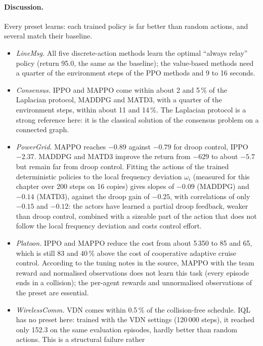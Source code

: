 \paragraph{Discussion.} Every preset learns: each trained policy is far better
than random actions, and several match their baseline.

\begin{itemize}
  \item \emph{LineMsg.} All five discrete-action methods learn the optimal
    ``always relay'' policy (return 95.0, the same as the baseline); the
    value-based methods need a quarter of the environment steps of the PPO
    methods and 9 to 16 seconds.
  \item \emph{Consensus.} IPPO and MAPPO come within about 2 and 5\,\% of the
    Laplacian protocol, MADDPG and MATD3, with a quarter of the environment
    steps, within about 11 and 14\,\%. The Laplacian protocol is a strong reference
    here: it is the classical solution of the consensus problem on a
    connected graph.
  \item \emph{PowerGrid.} MAPPO reaches $-0.89$ against $-0.79$ for droop
    control, IPPO $-2.37$. MADDPG and MATD3 improve the return from $-629$ to
    about $-5.7$ but remain far from droop control. Fitting the actions of the
    trained deterministic policies to the local frequency deviation $\omega_i$
    (measured for this chapter over 200 steps on 16 copies) gives slopes of
    $-0.09$ (MADDPG)
    and $-0.14$ (MATD3), against the droop gain of $-0.25$, with correlations
    of only $-0.15$ and $-0.12$: the actors have learned a partial droop
    feedback, weaker than droop control, combined with a sizeable part of the
    action that does not follow the local frequency deviation and costs
    control effort.
  \item \emph{Platoon.} IPPO and MAPPO reduce the cost from about 5\,350 to 85
    and 65, which is still 83 and 40\,\% above the cost of cooperative
    adaptive cruise control. According to the tuning notes in the source,
    MAPPO with the team reward and normalised observations does not learn this
    task (every episode ends in a collision); the per-agent rewards and
    unnormalised observations of the preset are essential.
  \item \emph{WirelessComm.} VDN comes within 0.5\,\% of the collision-free
    schedule. IQL has no preset here: trained with the VDN settings
    (120\,000 steps), it reached only 152.3 on the same evaluation episodes,
    hardly better than random actions. This is a structural failure rather

\end{itemize}
